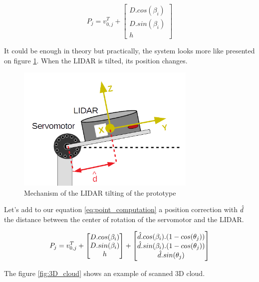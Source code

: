 \documentclass{article}
\begin{document}
\begin{equation}
\label{eq:point_computation}
    P_j = v_{0,j}^T + 
    \begin{bmatrix}
        D.cos(\beta_i) \\
        D.sin(\beta_i) \\
        h
    \end{bmatrix}
\end{equation}

It could be enough in theory but practically, the system looks more like presented on figure \ref{fig:prototype_tilting}. When the LIDAR is tilted, its position changes.

\begin{figure}[H]
    \centering
    \includegraphics[height = 6cm]{images/bias_real_system.png}
    \caption{Mechanism of the LIDAR tilting of the prototype}
    \label{fig:prototype_tilting}
\end{figure}

Let's add to our equation \ref{eq:point_computation} a position correction with $\Hat{d}$ the distance between the center of rotation of the servomotor and the LIDAR. 

\begin{equation}
    P_j = v_{0,j}^T + 
    \begin{bmatrix}
        D.cos(\beta_i) \\
        D.sin(\beta_i) \\
        h
    \end{bmatrix}
    +
    \begin{bmatrix}
    \Hat{d}.cos(\beta_i).(1-cos(\theta_j)) \\
    \Hat{d}.sin(\beta_i).(1-cos(\theta_j)) \\
    \Hat{d}.sin(\theta_j)
    \end{bmatrix}
\end{equation}

The figure \ref{fig:3D_cloud} shows an example of scanned 3D cloud.
\end{document}
